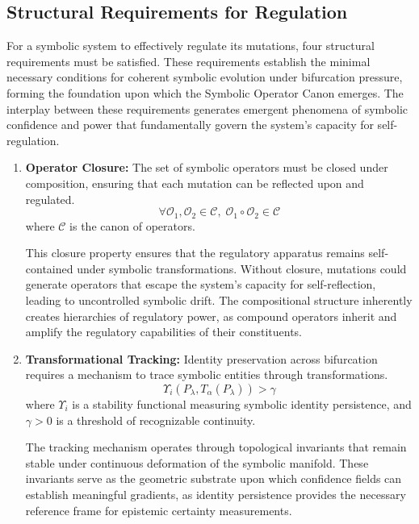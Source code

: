 \subsection{Structural Requirements for Regulation}
\label{subsec:bk6_structural_requirements_for_regulation}

For a symbolic system to effectively regulate its mutations, four structural requirements must be satisfied. These requirements establish the minimal necessary conditions for coherent symbolic evolution under bifurcation pressure, forming the foundation upon which the Symbolic Operator Canon emerges. The interplay between these requirements generates emergent phenomena of symbolic confidence and power that fundamentally govern the system's capacity for self-regulation.

\begin{enumerate}
\item \textbf{Operator Closure:} The set of symbolic operators must be closed under composition, ensuring that each mutation can be reflected upon and regulated.
\begin{equation}
\forall \mathcal{O}_1, \mathcal{O}_2 \in \mathcal{C}, \; \mathcal{O}_1 \circ \mathcal{O}_2 \in \mathcal{C}
\end{equation}
where $\mathcal{C}$ is the canon of operators.

This closure property ensures that the regulatory apparatus remains self-contained under symbolic transformations. Without closure, mutations could generate operators that escape the system's capacity for self-reflection, leading to uncontrolled symbolic drift. The compositional structure inherently creates hierarchies of regulatory power, as compound operators inherit and amplify the regulatory capabilities of their constituents.

\item \textbf{Transformational Tracking:} Identity preservation across bifurcation requires a mechanism to trace symbolic entities through transformations.
\begin{equation}
\Upsilon_i(P_{\lambda}, T_{\alpha}(P_{\lambda})) > \gamma
\end{equation}
where $\Upsilon_i$ is a stability functional measuring symbolic identity persistence, and $\gamma > 0$ is a threshold of recognizable continuity.

The tracking mechanism operates through topological invariants that remain stable under continuous deformation of the symbolic manifold. These invariants serve as the geometric substrate upon which confidence fields can establish meaningful gradients, as identity persistence provides the necessary reference frame for epistemic certainty measurements.


\end{enumerate}
